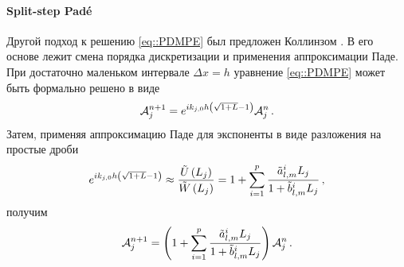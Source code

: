 \documentclass[../document.tex]{subfiles}
\begin{document}
            \paragraph{Split-step Pad\'e}
                \par Другой подход к решению \eqref{eq::PDMPE} был предложен Коллинзом \cite{collins}. В его основе лежит смена порядка дискретизации и применения аппроксимации Паде. При достаточно маленьком интервале $\Delta x=h$ уравнение \eqref{eq::PDMPE} может быть формально решено в виде
                \begin{equation}
                    \mathcal{A}_j^{n+1}=e^{ik_{j,0}h\left(\sqrt{1+L}-1\right)}\mathcal{A}_j^n\,.
                \end{equation}
                Затем, применяя аппроксимацию Паде для экспоненты в виде разложения на простые дроби
                \begin{equation}\label{eq::SSPADE}
                    e^{ik_{j,0}h\left(\sqrt{1+L}-1\right)}\approx\frac{\tilde{U}\left(L_j\right)}{\tilde{W}\left(L_j\right)}= 1+\sum\limits_{i=1}^p\frac{\tilde{a}_{l,m}^iL_j}{1+\tilde{b}_{l,m}^iL_j}\,,
                \end{equation}
                получим
                \begin{equation}
                    \mathcal{A}_j^{n+1}=\left(1+\sum\limits_{i=1}^p\frac{\tilde{a}_{l,m}^iL_j}{1+\tilde{b}_{l,m}^iL_j}\right)\mathcal{A}_j^n\,.
                \end{equation}
\end{document}
